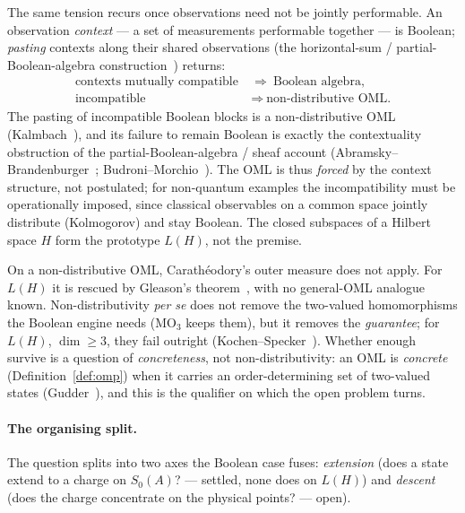 \documentclass[11pt,reqno]{amsart}
\theoremstyle{plain}
\theoremstyle{definition}
\theoremstyle{remark}
\begin{document}
The same tension recurs once observations need not be jointly performable.
An observation \emph{context} --- a set of measurements performable together
--- is Boolean; \emph{pasting} contexts along their shared observations (the
horizontal-sum / partial-Boolean-algebra construction~\cite{Kalmbach1983})
returns:
\[
  \begin{aligned}
  \text{contexts mutually compatible} &\ \Rightarrow\ \text{Boolean algebra},\\
  \text{incompatible} &\ \Rightarrow\ \text{non-distributive OML.}
  \end{aligned}
\]
The pasting of incompatible Boolean blocks is a non-distributive OML
(Kalmbach~\cite{Kalmbach1983}), and its failure to remain Boolean is exactly the
contextuality obstruction of the partial-Boolean-algebra / sheaf account
(Abramsky--Brandenburger~\cite{AbramskyBrandenburger2011};
Budroni--Morchio~\cite{BudroniMorchio2010}). The OML is thus \emph{forced} by the
context structure, not postulated; for non-quantum examples the incompatibility must be operationally
imposed, since classical observables on a common space jointly distribute
(Kolmogorov) and stay Boolean. The closed subspaces of a Hilbert space $H$ form the
prototype $L(H)$, not the premise.

On a non-distributive OML, Carath\'{e}odory's outer measure does not apply. For
$L(H)$ it is rescued by Gleason's theorem~\cite{Gleason1957}, with no general-OML
analogue known. Non-distributivity \emph{per se} does not remove the two-valued
homomorphisms the Boolean engine needs ($\mathrm{MO}_3$ keeps them), but it removes
the \emph{guarantee}; for $L(H)$, $\dim\geq3$, they fail outright
(Kochen--Specker~\cite{KochenSpecker1967}). Whether enough survive is a question of
\emph{concreteness}, not non-distributivity: an OML is \emph{concrete}
(Definition~\ref{def:omp}) when it carries an order-determining set of two-valued
states (Gudder~\cite{Gudder1979}), and this is the qualifier on which the open
problem turns.

\paragraph{The organising split.} The question splits into two axes the Boolean case
fuses: \emph{extension} (does a state extend to a charge on $S_0(A)$? --- settled,
none does on $L(H)$) and \emph{descent} (does the charge concentrate on the physical
points? --- open).
\end{document}
